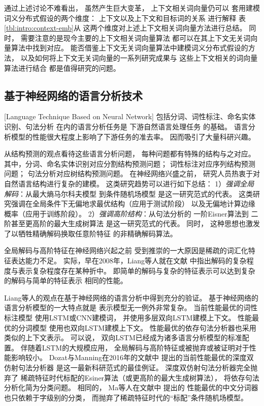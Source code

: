 通过上述讨论不难看出，
虽然产生巨大变革，
上下文相关词向量仍可以
套用建模词义分布式假设的两个维度：
上下文以及上下文和目标词的关系
进行解释
表\ref{tbl:intro:context-emb}从
这两个维度对上述上下文相关词向量方法进行总结。
同时，
需要注意的是现今主要的上下文相关词向量算法
都可以在其上下文无关词向量算法中找到对应。
能否借鉴上下文无关词向量算法中建模词义分布式假设的方法，
以及如何将上下文无关词向量的一系列研究成果与
这些上下文相关的词向量算法进行结合
都是值得研究的问题。

\subsection{基于神经网络的语言分析技术}[Language Technique Based on Neural Network]
包括分词、词性标注、命名实体识别、句法分析
在内的语言分析任务是
下游自然语言处理任务
的基础。
语言分析模型的性能很大程度上影响了下游任务的准去率。
因而吸引了大量科研兴趣。

从结构预测的观点看待这些语言分析问题，
每种问题都有特殊的结构与之对应。
其中，分词、命名实体识别对应分割结构预测问题；
词性标注对应序列结构预测问题；
句法分析对应树结构预测问题。
在神经网络兴盛之前，
研究人员热衷于对自然语言结构进行复杂的建模。
这类研究趋势可以进行如下总结：
1）\textit{强调全局解码}：从最大熵马尔科夫模型\cite{McCallum:2000:MEM:645529.658277}
到条件随机场模型\cite{Lafferty:2001:CRF:645530.655813}
是这一研究范式的代表。
这类研究强调在全局条件下无偏地求最优结构（应用于测试阶段）
以及无偏地计算边缘概率（应用于训练阶段）。
2）\textit{强调高阶结构}：从句法分析的
一阶Eisner算法\cite{eisner-1996-coling}到
二阶甚至更高阶的最大生成树算法\cite{mcdonald2006online}
是这一研究范式的代表。
同时，
这种思想也激发了以牺牲精确解码换取任意阶特征
的非精确解码算法\cite{zhang-clark:cl:2011}。

全局解码与高阶特征在神经网络兴起之前
受到推崇的一大原因是稀疏的词汇化特征表达能力不足。
实际，早在2008年，Liang等人就在文献
中指出解码的复杂程度与表示复杂程度存在某种折中。
即简单的解码与复杂的特征表示可以达到复杂的解码与简单的特征表示
相同的性能。

Liang等人的观点在基于神经网络的语言分析中得到充分的验证。
基于神经网络的语言分析模型的一大特点就是
表示模型无一例外非常复杂。
当前性能最优的词性标注模型\cite{ma-hovy:2016:P16-1,lample-EtAl:2016:N16-1}
使用LSTM或CNN建模词，
并使用多层双向LSTM建模上下文。
性能最优的分词模型\cite{ma-ganchev-weiss:2018:EMNLP}
使用也双向LSTM建模上下文。
性能最优的依存句法分析器\cite{DBLP:journals/corr/DozatM16}也采用类似的上下文表示。
可以说，
双向LSTM已经成为诸多语言分析模型的标准配置。
伴随着LSTM的大规模应用，
全局解码与高阶特征或被抛弃或被证明对于性能影响较小。
Dozat与Manning在2016年的文献中
提出的当前性能最优的深度双仿射句法分析器
是这一最新科研范式的最佳例证。
深度双仿射句法分析器完全抛弃了
稀疏特征时代标配的Esiner算法（或更高阶的最大生成树算法），
将依存句法分析化简为分类问题。
相同的，
Ma等人在文献中
提出的
性能最优的中文分词器也只依赖于字级别的分类，
而抛弃了稀疏特征时代的``标配''条件随机场模型。

